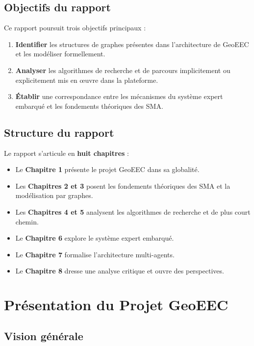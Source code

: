 \documentclass[12pt, a4paper]{report}
\theoremstyle{definition}
\begin{document}
\section{Objectifs du rapport}

Ce rapport poursuit trois objectifs principaux :

\begin{enumerate}
  \item \textbf{Identifier} les structures de graphes présentes dans l'architecture de GeoEEC et les modéliser formellement.
  \item \textbf{Analyser} les algorithmes de recherche et de parcours implicitement ou explicitement mis en œuvre dans la plateforme.
  \item \textbf{Établir} une correspondance entre les mécanismes du système expert embarqué et les fondements théoriques des SMA.
\end{enumerate}

\section{Structure du rapport}

Le rapport s'articule en \textbf{huit chapitres} :
\begin{itemize}
  \item Le \textbf{Chapitre 1} présente le projet GeoEEC dans sa globalité.
  \item Les \textbf{Chapitres 2 et 3} posent les fondements théoriques des SMA et la modélisation par graphes.
  \item Les \textbf{Chapitres 4 et 5} analysent les algorithmes de recherche et de plus court chemin.
  \item Le \textbf{Chapitre 6} explore le système expert embarqué.
  \item Le \textbf{Chapitre 7} formalise l'architecture multi-agents.
  \item Le \textbf{Chapitre 8} dresse une analyse critique et ouvre des perspectives.
\end{itemize}

\chapter{Présentation du Projet GeoEEC}

\section{Vision générale}
\end{document}
